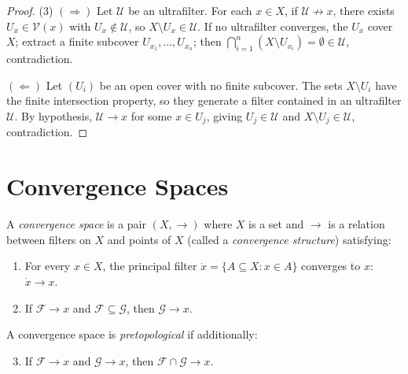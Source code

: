 \begin{proof}
(3) $(\Rightarrow)$ Let $\mathcal{U}$ be an ultrafilter. For each $x \in X$, if
$\mathcal{U} \not\to x$, there exists $U_x \in \mathcal{V}(x)$ with
$U_x \notin \mathcal{U}$, so $X \setminus U_x \in \mathcal{U}$. If no ultrafilter
converges, the $U_x$ cover $X$; extract a finite subcover $U_{x_1}, \ldots, U_{x_n}$;
then $\bigcap_{i=1}^n (X \setminus U_{x_i}) = \emptyset \in \mathcal{U}$, contradiction.

$(\Leftarrow)$ Let $(U_i)$ be an open cover with no finite subcover. The sets
$X \setminus U_i$ have the finite intersection property, so they generate a filter
contained in an ultrafilter $\mathcal{U}$. By hypothesis, $\mathcal{U} \to x$ for some
$x \in U_j$, giving $U_j \in \mathcal{U}$ and $X \setminus U_j \in \mathcal{U}$,
contradiction.
\end{proof}

\section{Convergence Spaces}

\begin{definition}
A \emph{convergence space} is a pair $(X, \to)$ where $X$ is a set and $\to$ is a relation
between filters on $X$ and points of $X$ (called a \emph{convergence structure})
satisfying:
\begin{enumerate}
  \item For every $x \in X$, the principal filter
    $\dot{x} = \{A \subseteq X : x \in A\}$ converges to $x$: $\dot{x} \to x$.
  \item If $\mathcal{F} \to x$ and $\mathcal{F} \subseteq \mathcal{G}$, then
    $\mathcal{G} \to x$.
\end{enumerate}
\end{definition}

\begin{definition}
A convergence space is \emph{pretopological} if additionally:
\begin{enumerate}
  \setcounter{enumi}{2}
  \item If $\mathcal{F} \to x$ and $\mathcal{G} \to x$, then
    $\mathcal{F} \cap \mathcal{G} \to x$.
\end{enumerate}
\end{definition}

